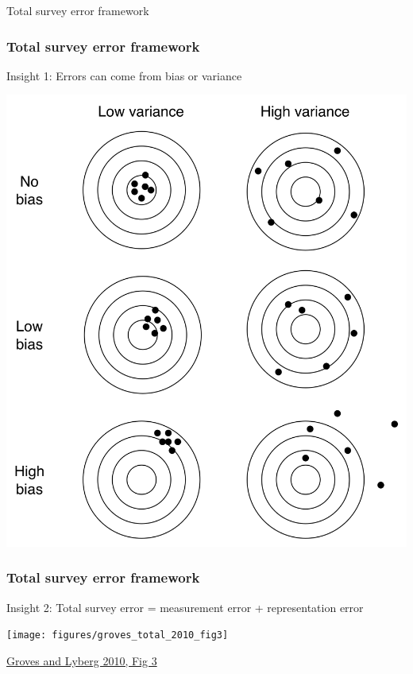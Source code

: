 \documentclass[aspectratio=169]{beamer}
\begin{document}
\begin{frame}

\begin{center}
Total survey error framework
\end{center}

\end{frame}
\begin{frame}
\frametitle{Total survey error framework}

Insight 1: Errors can come from bias or variance\\
\pause
\begin{center}
\includegraphics[height=0.6\textheight]{figures/bitbybit3-1_bias-variance}
\end{center}

\end{frame}
\begin{frame}
\frametitle{Total survey error framework}

Insight 2: Total survey error = measurement error + representation error \\ 
\pause
\begin{center}
\texttt{[image: figures/groves\_total\_2010\_fig3]}
\end{center}

\vfill
\small{\href{https://dx.doi.org/10.1093/poq/nfq065}{Groves and Lyberg 2010, Fig 3}}

\end{frame}
\end{document}
